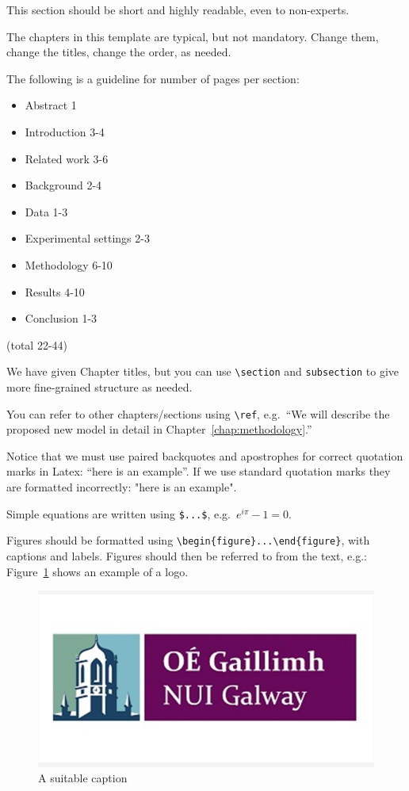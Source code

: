 \documentclass[oneside,12pt]{Classes/RoboticsLaTeX}
\begin{document}
This section should be short and highly readable, even to non-experts.

The chapters in this template are typical, but not mandatory. Change them, change the titles, change the order, as needed.

The following is a guideline for number of pages per section:

\begin{itemize}
\item Abstract 1
\item Introduction 3-4
\item Related work 3-6
\item Background 2-4
\item Data 1-3
\item Experimental settings 2-3
\item Methodology 6-10
\item Results 4-10
\item Conclusion 1-3
\end{itemize}

(total 22-44)

We have given Chapter titles, but you can use \verb+\section+ and \verb+subsection+ to give more fine-grained structure as needed.

You can refer to other chapters/sections using \verb+\ref+, e.g.~``We will describe the proposed new model in detail in Chapter~\ref{chap:methodology}.''

Notice that we must use paired backquotes and apostrophes for correct quotation marks in Latex: ``here is an example''. If we use standard quotation marks they are formatted incorrectly: "here is an example".

Simple equations are written using \verb+$...$+, e.g.~$e^{i\pi} - 1 = 0$.

Figures should be formatted using \verb+\begin{figure}...\end{figure}+, with captions and labels. Figures should then be referred to from the text, e.g.: Figure~\ref{fig:logo} shows an example of a logo.
\begin{figure}
    \centering
    \includegraphics[width=0.5\linewidth]{Figures/logo_NUI.png}
    \caption{A suitable caption}
    \label{fig:logo}
\end{figure}
\end{document}
